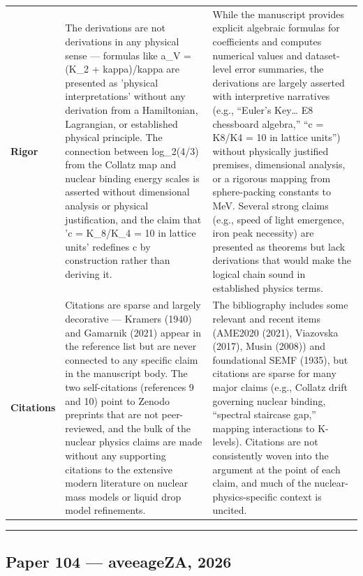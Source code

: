 \documentclass[11pt]{article}
\begin{document}
\begin{longtable}{@{} p{2.2cm} p{6.3cm} p{6.3cm} @{}}
\rowcolor{rowgray}
\textbf{Rigor} &
The derivations are not derivations in any physical sense --- formulas like a\_V = (K\_2 + kappa)/kappa are presented as 'physical interpretations' without any derivation from a Hamiltonian, Lagrangian, or established physical principle. The connection between log\_2(4/3) from the Collatz map and nuclear binding energy scales is asserted without dimensional analysis or physical justification, and the claim that 'c = K\_8/K\_4 = 10 in lattice units' redefines c by construction rather than deriving it. &
While the manuscript provides explicit algebraic formulas for coefficients and computes numerical values and dataset-level error summaries, the derivations are largely asserted with interpretive narratives (e.g., ``Euler's Key\ldots{} E8 chessboard algebra,'' ``c = K8/K4 = 10 in lattice units'') without physically justified premises, dimensional analysis, or a rigorous mapping from sphere-packing constants to MeV. Several strong claims (e.g., speed of light emergence, iron peak necessity) are presented as theorems but lack derivations that would make the logical chain sound in established physics terms. \\[6pt]

\textbf{Citations} &
Citations are sparse and largely decorative --- Kramers (1940) and Gamarnik (2021) appear in the reference list but are never connected to any specific claim in the manuscript body. The two self-citations (references 9 and 10) point to Zenodo preprints that are not peer-reviewed, and the bulk of the nuclear physics claims are made without any supporting citations to the extensive modern literature on nuclear mass models or liquid drop model refinements. &
The bibliography includes some relevant and recent items (AME2020 (2021), Viazovska (2017), Musin (2008)) and foundational SEMF (1935), but citations are sparse for many major claims (e.g., Collatz drift governing nuclear binding, ``spectral staircase gap,'' mapping interactions to K-levels). Citations are not consistently woven into the argument at the point of each claim, and much of the nuclear-physics-specific context is uncited. \\

\end{longtable}

\bigskip
\hrule
\bigskip

\subsection*{Paper 104 --- aveeageZA, 2026}
\end{document}
